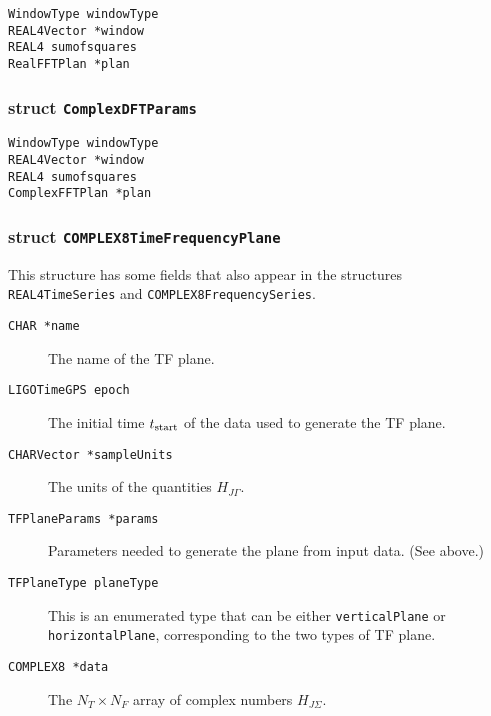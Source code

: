 \noindent 

\begin{description}
\item[\texttt{WindowType windowType}]
\item[\texttt{REAL4Vector *window}]
\item[\texttt{REAL4 sumofsquares}]
\item[\texttt{RealFFTPlan *plan}]
\end{description}

\subsubsection*{struct \texttt{ComplexDFTParams}}

\noindent 

\begin{description}
\item[\texttt{WindowType  windowType}]
\item[\texttt{REAL4Vector   *window}]
\item[\texttt{REAL4  sumofsquares}]
\item[\texttt{ComplexFFTPlan  *plan}]
\end{description}

\subsubsection*{struct \texttt{COMPLEX8TimeFrequencyPlane}}

\noindent 
This structure has some fields that also appear in the structures
\verb+REAL4TimeSeries+ and \verb+COMPLEX8FrequencySeries+.

\begin{description}
\item[\texttt{CHAR  *name}] The name of the TF plane.

\item[\texttt{LIGOTimeGPS   epoch}] The initial time $t_{\rm start}$ of the
data used to generate the TF plane.

\item[\texttt{CHARVector  *sampleUnits}] The units of the quantities $H_{J\Gamma}$.

\item[\texttt{TFPlaneParams   *params}]  Parameters needed to generate the
plane from input data.  (See above.)

\item[\texttt{TFPlaneType   planeType}]  This is an enumerated type that can
be either \verb+verticalPlane+ or \verb+horizontalPlane+, corresponding to the
two types of TF plane. 

\item[\texttt{COMPLEX8   *data}]  The $N_T \times N_F$ array of complex
numbers $H_{J\Sigma}$.

\end{description}

